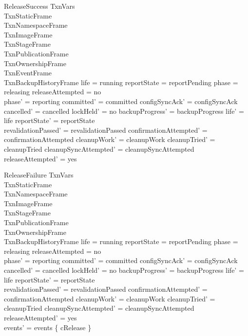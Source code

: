 \documentclass{article}
\begin{document}
\begin{schema}{ReleaseSuccess}
	\Delta TxnVars \\
	TxnStaticFrame \\
	TxnNamespaceFrame \\
	TxnImageFrame \\
	TxnStageFrame \\
	TxnPublicationFrame \\
	TxnOwnershipFrame \\
	TxnEventFrame \\
	TxnBackupHistoryFrame
	\where
	life = running \land reportState = reportPending \land phase = releasing \land
	releaseAttempted = no \\
	phase' = reporting \land committed' = committed \land
	configSyncAck' = configSyncAck \land cancelled' = cancelled \land
	lockHeld' = no \land backupProgress' = backupProgress \land
	life' = life \land reportState' = reportState \\
	revalidationPassed' = revalidationPassed \land
	confirmationAttempted' = confirmationAttempted \land
	cleanupWork' = cleanupWork \land cleanupTried' = cleanupTried \land
	cleanupSyncAttempted' = cleanupSyncAttempted \land releaseAttempted' = yes
\end{schema}

\begin{schema}{ReleaseFailure}
	\Delta TxnVars \\
	TxnStaticFrame \\
	TxnNamespaceFrame \\
	TxnImageFrame \\
	TxnStageFrame \\
	TxnPublicationFrame \\
	TxnOwnershipFrame \\
	TxnBackupHistoryFrame
	\where
	life = running \land reportState = reportPending \land phase = releasing \land
	releaseAttempted = no \\
	phase' = reporting \land committed' = committed \land
	configSyncAck' = configSyncAck \land cancelled' = cancelled \land
	lockHeld' = no \land backupProgress' = backupProgress \land
	life' = life \land reportState' = reportState \\
	revalidationPassed' = revalidationPassed \land
	confirmationAttempted' = confirmationAttempted \land
	cleanupWork' = cleanupWork \land cleanupTried' = cleanupTried \land
	cleanupSyncAttempted' = cleanupSyncAttempted \land releaseAttempted' = yes \\
	events' = events \cup \{ cRelease \}
\end{schema}
\end{document}
